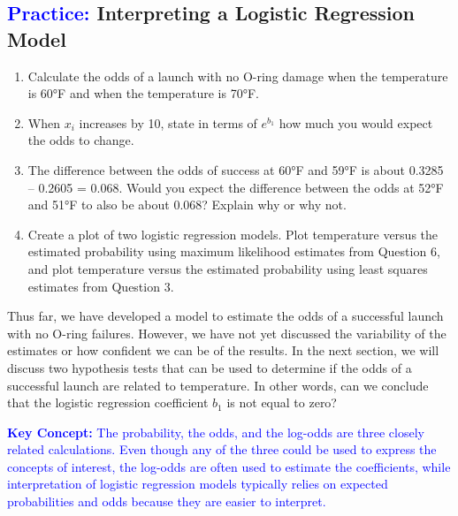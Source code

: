\documentclass[
]{report}
\begin{document}
\hypertarget{interpreting-a-logistic-regression-model}{%
\subsection*{\texorpdfstring{\textcolor{blue}{Practice:} Interpreting a Logistic Regression Model}{ Interpreting a Logistic Regression Model}}\label{interpreting-a-logistic-regression-model}}

\begin{enumerate}
\def\labelenumi{\arabic{enumi}.}
\setcounter{enumi}{7}
\item
  Calculate the odds of a launch with no O-ring damage when the temperature is 60°F and when the temperature is 70°F.
\item
  When \(\scriptstyle x_i\) increases by 10, state in terms of \(\scriptstyle e^{b_1}\) how much you would expect the odds to change.\\
\item
  The difference between the odds of success at 60°F and 59°F is about 0.3285 -- 0.2605 = 0.068. Would you expect the difference between the odds at 52°F and 51°F to also be about 0.068? Explain why or why not.
\item
  Create a plot of two logistic regression models. Plot temperature versus the estimated probability using maximum likelihood estimates from Question 6, and plot temperature versus the estimated probability using least squares estimates from Question 3.
\end{enumerate}

Thus far, we have developed a model to estimate the odds of a successful launch with no O-ring failures. However, we have not yet discussed the variability of the estimates or how confident we can be of the results. In the next section, we will discuss two hypothesis tests that can be used to determine if the odds of a successful launch are related to temperature. In other words, can we conclude that the logistic regression coefficient \(\scriptstyle b_1\) is not equal to zero?

\textbf{\textcolor{blue}{Key Concept:}} \textcolor{blue}{The probability, the odds, and the log-odds are three closely related calculations. Even though any of the three could be used to express the concepts of interest, the log-odds are often used to estimate the coefficients, while interpretation of logistic regression models typically relies on expected probabilities and odds because they are easier to interpret.}
\end{document}
